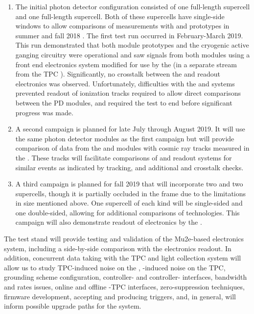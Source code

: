 \begin{enumerate}
    \item The initial photon detector configuration consisted of one full-length  supercell and one full-length  supercell.  Both of these supercells have single-side windows to allow comparisons of measurements with  and  prototypes in summer and fall 2018 .  
    The first test run occurred in February-March 2019. This run demonstrated that both module prototypes and the cryogenic active ganging circuitry were operational and saw signals from both modules using a  front end electronics system modified for use by the   (in a separate stream from the TPC ). Significantly, no crosstalk between the  and  readout electronics was observed.  Unfortunately, difficulties with the   and  systems prevented readout of ionization tracks required to allow direct comparisons between the PD modules, and required the test to end before significant progress was made.



    \item A second campaign is planned for late July through August 2019. It will use the same photon detector modules as the first campaign but will provide comparison of data from the  and  modules with cosmic ray tracks measured in the .  These tracks will facilitate comparisons of  and  readout systems for similar events as indicated by  tracking, and additional  and  crosstalk checks.

    \item A third campaign is planned for fall 2019 that will incorporate two  and two  supercells, though it is partially occluded in the frame due to the limitations in  size mentioned above.  One supercell of each kind will be single-sided and one double-sided, allowing for additional comparisons of  technologies.  This campaign will also demonstrate readout of  electronics by the  .
    
\end{enumerate}

The test stand will provide testing and validation of the  Mu2e-based electronics system, including a side-by-side comparison with the   electronics readout. In addition, concurrent data taking with the TPC and light collection system will allow us to study TPC-induced noise on the , -induced noise on the TPC, grounding scheme configuration, controller- and controller- interfaces, bandwidth and rates issues, online and offline -TPC interfaces, zero-suppression techniques, firmware development, accepting and producing triggers, and, in general, will inform possible upgrade paths for the system. 


